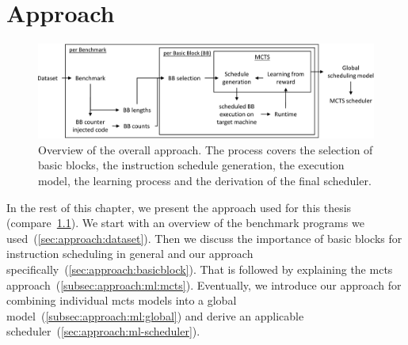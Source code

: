 \chapter{Approach}

\begin{figure}
    \centering
    \includegraphics[width=\textwidth]{img/ppt/approach_overview-crop.pdf}
    \caption[Overview of the approach]{Overview of the overall approach. 
    The process covers the selection of basic blocks, the instruction schedule generation, the execution model, the learning process and the derivation of the final scheduler.}
    \label{fig:approach:overview}
\end{figure}
In the rest of this chapter, we present the approach used for this thesis (compare~\cref{fig:approach:overview}).
We start with an overview of the benchmark programs we used~(\cref{sec:approach:dataset}).
Then we discuss the importance of basic blocks for instruction scheduling in general and our approach specifically~(\cref{sec:approach:basicblock}).
That is followed by explaining the \ac{mcts} approach~(\cref{subsec:approach:ml:mcts}).
Eventually, we introduce our approach for combining individual \ac{mcts} models into a global model~(\cref{subsec:approach:ml:global}) and derive an applicable scheduler~(\cref{sec:approach:ml-scheduler}).

